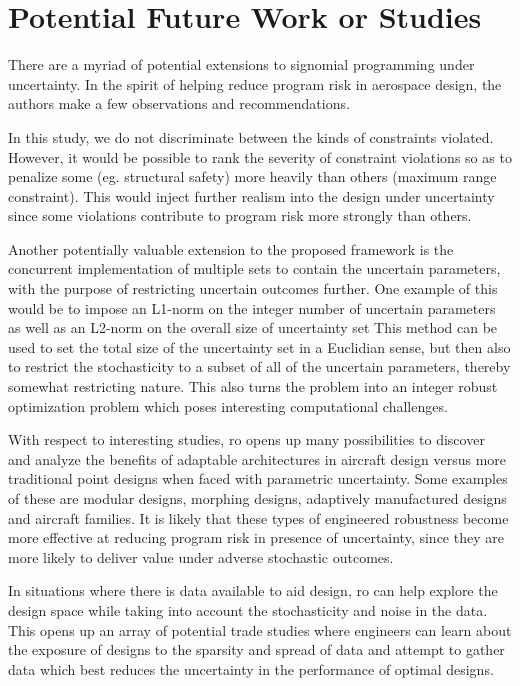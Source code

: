\section{Potential Future Work or Studies}

There are a myriad of potential extensions to signomial programming under uncertainty.
In the spirit of helping reduce program risk in aerospace design,
the authors make a few observations and recommendations.

In this study, we do not discriminate between the kinds of constraints violated. However, it would
be possible to rank the severity of constraint violations so as to penalize some (eg. structural safety)
more heavily than others (maximum range constraint). This would inject further realism into the
design under uncertainty since some violations contribute to program risk more
strongly than others.

Another potentially valuable extension to the proposed framework is the concurrent implementation
of multiple sets to contain the uncertain parameters, with the purpose of restricting uncertain
outcomes further. One example of this would be to impose an  L1-norm on the integer number of uncertain parameters
as well as an L2-norm on the overall size of uncertainty set
This method can be used to set the total size of the uncertainty set in a Euclidian sense,
but then also to restrict the stochasticity to a subset of all of the uncertain parameters,
thereby somewhat restricting nature. This also turns the problem into an integer robust
optimization problem which poses interesting computational challenges.

With respect to interesting studies, \gls{ro} opens up many possibilities to discover and analyze the benefits
of adaptable architectures in aircraft design versus more traditional point designs
when faced with parametric uncertainty. Some examples of these are modular designs, morphing designs,
adaptively manufactured designs and aircraft families. It is likely that these types of engineered
robustness become more effective at reducing program risk in presence of uncertainty, since they are more likely
to deliver value under adverse stochastic outcomes.

In situations where there is data available to aid design, \gls{ro} can help explore
the design space while taking into account the stochasticity and noise in the data.
This opens up an array of potential trade studies where engineers can learn about
the exposure of designs to the sparsity and spread of data and attempt to gather
data which best reduces the uncertainty in the performance of optimal designs.
